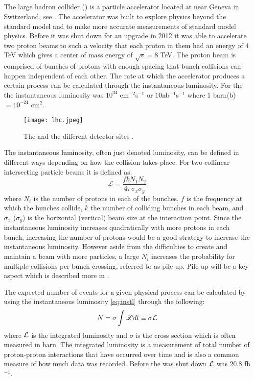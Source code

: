 \subsection{\abbrLHC}
The large hadron collider (\abbrLHC) is a particle accelerator located at \abbrCERN near Geneva in Switzerland, see . The accelerator was built to explore physics beyond the standard model and to make more accurate measurements of standard model physics. Before it was shut down for an upgrade in 2012 it was able to accelerate two proton beams to such a velocity that each proton in them had an energy of 4 TeV which gives a center of mass energy of $\sqrt{s}=8$ TeV. The proton beam is comprised of bunches of protons with enough spacing that bunch collisions can happen independent of each other. The rate at which the accelerator produces a certain process can be calculated through the instantaneous luminosity. For the \abbrLHC the instantaneous luminosity was $10^{34}$ cm$^{-2}$s$^{-1}$ \citep{lumires} or $10$nb$^{-1}$s$^{-1}$ where 1 barn(b)$=10^{-24}$ cm$^2$.
\begin{figure}[H]
\begin{center}
\texttt{[image: lhc.jpeg]}
\caption{The \abbrLHC and the different detector sites \citep{lhcimage}.}
\label{fig:lhc}
\end{center}
\end{figure}
The instantaneous luminosity, often just denoted luminosity, can be defined in different ways depending on how the collision takes place. For two collinear intersecting particle beams it is defined as:
\begin{equation}\label{eq:instl}
\mathscr{L} = \frac{fkN_1 N_2}{4\pi \sigma_x \sigma_y}
\end{equation}
where $N_i$ is the number of protons in each of the bunches, $f$ is the frequency at which the bunches collide, $k$ the number of colliding bunches in each beam, and $\sigma_x$ ($\sigma_y$) is the horizontal (vertical) beam size at the interaction point. Since the instantaneous luminosity increases quadratically with more protons in each bunch, increasing the number of protons would be a good strategy to increase the instantaneous luminosity. However aside from the difficulties to create and maintain a beam with more particles, a large $N_i$ increases the probability for multiple collisions per bunch crossing, referred to as pile-up. Pile up will be a key aspect which is described more in . 

The expected number of events for a given physical process can be calculated by using the instantaneous luminosity \eqref{eq:instl} through the following:
\begin{equation}\label{eq:Numevents}
N=\sigma \int \mathscr{L} dt \equiv \sigma \mathcal{L}
\end{equation}
where $\mathcal{L}$ is the integrated luminosity and $\sigma$ is the cross section which is often measured in barn.
The integrated luminosity is a measurement of total number of proton-proton interactions that have occurred over time and is also a common measure of how much data was recorded. Before the \abbrLHC was shut down $\mathcal{L}$ was 20.8 fb$^{-1}$.

